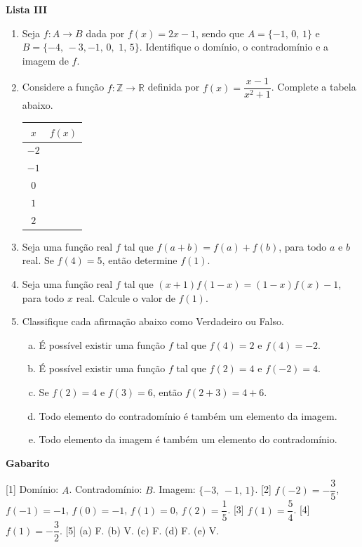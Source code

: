 \documentclass[12pt,a4paper]{article}
\begin{document}
\begin{center}
  \textbf{Lista III}
\end{center}

\begin{enumerate}
  \item Seja $f:A\to B$ dada por $f(x) = 2x - 1$, sendo que
    $A = \{-1,\,0,\,1\}$ e $B = \{-4,\,-3,-1,\,0,\,\,1,\,5\}$.
    Identifique o domínio, o contradomínio e a imagem de $f$.

  \item Considere a função $f:\mathbb{Z}\to\mathbb{R}$ definida por $f(x)=\dfrac{x - 1}{x^2 + 1}$. 
    Complete a tabela abaixo.

    \begin{table}[H]
      \centering
      \begin{tabular}{c|c}
          $x$ & $f(x)$ \\ \hline
          $-2$ &  \\ \hline
          $-1$ &  \\ \hline
          $0$ &  \\ \hline
          $1$ &  \\ \hline
          $2$ &
      \end{tabular}
    \end{table}
    
  \item Seja uma função real $f$ tal que $f(a + b) = f(a) + f(b)$, para 
  todo $a$ e $b$ real. Se $f(4) = 5$, então determine $f(1)$.

  \item Seja uma função real $f$ tal que $(x + 1)f(1 - x) = (1 - x)f(x) - 1$, para 
  todo $x$ real. Calcule o valor de $f(1)$.
  
  \item Classifique cada afirmação abaixo como Verdadeiro ou Falso.
    \begin{enumerate}[(a)]
      \item É possível existir uma função $f$ tal que $f(4) = 2$ e $f(4) = -2$.
      \item É possível existir uma função $f$ tal que $f(2) = 4$ e $f(-2) = 4$.
      \item Se $f(2) = 4$ e $f(3) = 6$, então $f(2 + 3) = 4 + 6$.
      \item Todo elemento do contradomínio é também um elemento da imagem.
      \item Todo elemento da imagem é também um elemento do contradomínio.
    \end{enumerate}
    
\end{enumerate}

\begin{center}
  \textbf{Gabarito}
\end{center}

[1] Domínio: $A$. Contradomínio: $B$. Imagem: $\{-3,\,-1,\,1\}$. 
[2] $f(-2) = -\dfrac{3}{5}$, $f(-1) = -1$, $f(0) = -1$, $f(1) = 0$, $f(2) = \dfrac{1}{5}$. 
[3] $f(1) = \dfrac{5}{4}$. 
[4] $f(1) = -\dfrac{3}{2}$. 
[5] (a) F. (b) V. (c) F. (d) F. (e) V.
\end{document}
